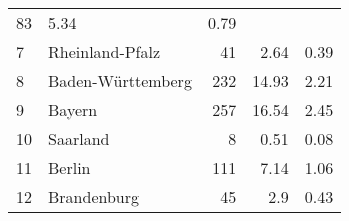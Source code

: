 \begin{longtable}{lXrrr}
       \num{83} &
       \num[round-mode=places,round-precision=2]{5,34} &
         \num[round-mode=places,round-precision=2]{0,79} \\

     7 &
     \multicolumn{1}{X}{ Rheinland-Pfalz   } &


       \num{41} &
       \num[round-mode=places,round-precision=2]{2,64} &
         \num[round-mode=places,round-precision=2]{0,39} \\

     8 &
     \multicolumn{1}{X}{ Baden-Württemberg   } &


       \num{232} &
       \num[round-mode=places,round-precision=2]{14,93} &
         \num[round-mode=places,round-precision=2]{2,21} \\

     9 &
     \multicolumn{1}{X}{ Bayern   } &


       \num{257} &
       \num[round-mode=places,round-precision=2]{16,54} &
         \num[round-mode=places,round-precision=2]{2,45} \\

     10 &
     \multicolumn{1}{X}{ Saarland   } &


       \num{8} &
       \num[round-mode=places,round-precision=2]{0,51} &
         \num[round-mode=places,round-precision=2]{0,08} \\

     11 &
     \multicolumn{1}{X}{ Berlin   } &


       \num{111} &
       \num[round-mode=places,round-precision=2]{7,14} &
         \num[round-mode=places,round-precision=2]{1,06} \\

     12 &
     \multicolumn{1}{X}{ Brandenburg   } &


       \num{45} &
       \num[round-mode=places,round-precision=2]{2,9} &
         \num[round-mode=places,round-precision=2]{0,43} \\


\end{longtable}
